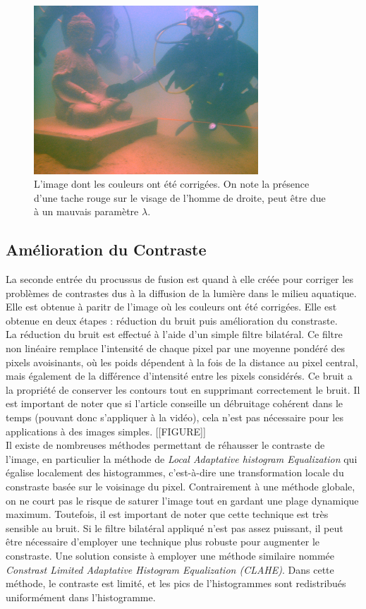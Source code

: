 \documentclass[twoside]{article}
\begin{document}
\begin{figure}[H]
  \centering
  \includegraphics[width=0.75\textwidth]{Support/color.png}
  \caption{L'image dont les couleurs ont été corrigées. On note la présence d'une tache rouge sur le visage de l'homme de droite, peut être due à un mauvais paramètre $\lambda$.}
\end{figure}

\subsection{Amélioration du Contraste}
La seconde entrée du procussus de fusion est quand à elle créée pour corriger les problèmes de contrastes dus à la diffusion de la lumière dans le milieu aquatique. Elle est obtenue à paritr de l'image où les couleurs ont été corrigées. Elle est obtenue en deux étapes : réduction du bruit puis amélioration du constraste.\\
La réduction du bruit est effectué à l'aide d'un simple filtre bilatéral. Ce filtre non linéaire remplace l'intensité de chaque pixel par une moyenne pondéré des pixels avoisinants, où les poids dépendent à la fois de la distance au pixel central, mais également de la différence d'intensité entre les pixels considérés. Ce bruit a la propriété de conserver les contours tout en supprimant correctement le bruit. Il est important de noter que si l'article conseille un débruitage cohérent dans le temps (pouvant donc s'appliquer à la vidéo), cela n'est pas nécessaire pour les applications à des images simples. [[FIGURE]]\\
Il existe de nombreuses méthodes permettant de réhausser le contraste de l'image, en particulier la méthode de \emph{Local Adaptative histogram Equalization} qui égalise localement des histogrammes, c'est-à-dire une transformation locale du constraste basée sur le voisinage du pixel. Contrairement à une méthode globale, on ne court pas le risque de saturer l'image tout en gardant une plage dynamique maximum. Toutefois, il est important de noter que cette technique est très sensible au bruit. Si le filtre bilatéral appliqué n'est pas assez puissant, il peut être nécessaire d'employer une technique plus robuste pour augmenter le constraste. Une solution consiste à employer une méthode similaire nommée \emph{Constrast Limited Adaptative Histogram Equalization (CLAHE)}. Dans cette méthode, le contraste est limité, et les pics de l'histogrammes sont redistribués uniformément dans l'histogramme.
\end{document}
